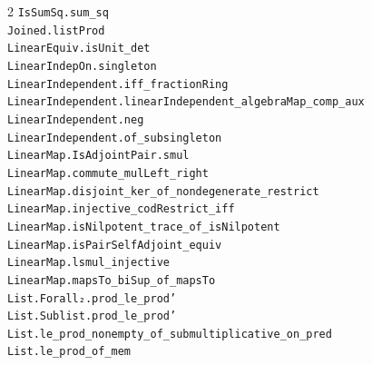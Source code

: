 \documentclass[10pt,a4paper]{article}
\begin{document}
\begin{multicols}{2}
\texttt{IsSumSq.\allowbreak{}sum\_sq} \\
\texttt{Joined.\allowbreak{}listProd} \\
\texttt{LinearEquiv.\allowbreak{}isUnit\_det} \\
\texttt{LinearIndepOn.\allowbreak{}singleton} \\
\texttt{LinearIndependent.\allowbreak{}iff\_fractionRing} \\
\texttt{LinearIndependent.\allowbreak{}linearIndependent\_algebraMap\_comp\_aux} \\
\texttt{LinearIndependent.\allowbreak{}neg} \\
\texttt{LinearIndependent.\allowbreak{}of\_subsingleton} \\
\texttt{LinearMap.\allowbreak{}IsAdjointPair.\allowbreak{}smul} \\
\texttt{LinearMap.\allowbreak{}commute\_mulLeft\_right} \\
\texttt{LinearMap.\allowbreak{}disjoint\_ker\_of\_nondegenerate\_restrict} \\
\texttt{LinearMap.\allowbreak{}injective\_codRestrict\_iff} \\
\texttt{LinearMap.\allowbreak{}isNilpotent\_trace\_of\_isNilpotent} \\
\texttt{LinearMap.\allowbreak{}isPairSelfAdjoint\_equiv} \\
\texttt{LinearMap.\allowbreak{}lsmul\_injective} \\
\texttt{LinearMap.\allowbreak{}mapsTo\_biSup\_of\_mapsTo} \\
\texttt{List.\allowbreak{}Forall₂.\allowbreak{}prod\_le\_prod'} \\
\texttt{List.\allowbreak{}Sublist.\allowbreak{}prod\_le\_prod'} \\
\texttt{List.\allowbreak{}le\_prod\_nonempty\_of\_submultiplicative\_on\_pred} \\
\texttt{List.\allowbreak{}le\_prod\_of\_mem} \\

\end{multicols}
\end{document}
